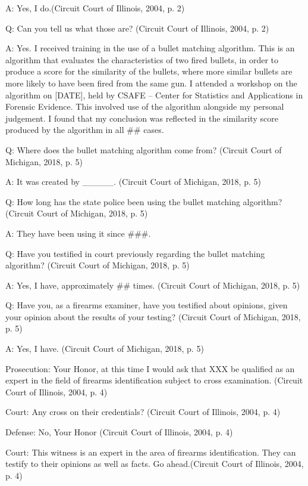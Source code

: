 \documentclass[print]{nuthesis}
\begin{document}
A: Yes, I do.(Circuit Court of Illinois, 2004, p. 2)

Q: Can you tell us what those are? (Circuit Court of Illinois, 2004, p. 2)

A: Yes. I received training in the use of a bullet matching algorithm.
This is an algorithm that evaluates the characteristics of two fired bullets, in order to produce a score for the similarity of the bullets, where more similar bullets are more likely to have been fired from the same gun.
I attended a workshop on the algorithm on {[}DATE{]}, held by CSAFE -- Center for Statistics and Applications in Forensic Evidence.
This involved use of the algorithm alongside my personal judgement.
I found that my conclusion was reflected in the similarity score produced by the algorithm in all \#\# cases.

Q: Where does the bullet matching algorithm come from? (Circuit Court of Michigan, 2018, p. 5)

A: It was created by \_\_\_\_\_. (Circuit Court of Michigan, 2018, p. 5)

Q: How long has the state police been using the bullet matching algorithm? (Circuit Court of Michigan, 2018, p. 5)

A: They have been using it since \#\#\#.

Q: Have you testified in court previously regarding the bullet matching algorithm? (Circuit Court of Michigan, 2018, p. 5)

A: Yes, I have, approximately \#\# times. (Circuit Court of Michigan, 2018, p. 5)

Q: Have you, as a firearms examiner, have you testified about opinions, given your opinion about the results of your testing? (Circuit Court of Michigan, 2018, p. 5)

A: Yes, I have. (Circuit Court of Michigan, 2018, p. 5)

Prosecution: Your Honor, at this time I would ask that XXX be qualified as an expert in the field of firearms identification subject to cross examination. (Circuit Court of Illinois, 2004, p. 4)

Court: Any cross on their credentials? (Circuit Court of Illinois, 2004, p. 4)

Defense: No, Your Honor (Circuit Court of Illinois, 2004, p. 4)

Court: This witness is an expert in the area of firearms identification.
They can testify to their opinions as well as facts.
Go ahead.(Circuit Court of Illinois, 2004, p. 4)
\end{document}
